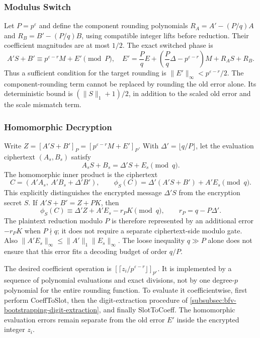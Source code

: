 \subsubsection{Modulus Switch}
\label{subsubsec:bfv-bootstrapping-modulus-switch}

Let $P=p^\varepsilon$ and define the component rounding polynomials $R_A=A'-(P/q)A$ and $R_B=B'-(P/q)B$, using compatible integer lifts before reduction. Their coefficient magnitudes are at most $1/2$. The exact switched phase is
\[
A'S+B'\equiv p^{\varepsilon-r}M+E'\pmod P,
\quad E'=\frac PqE+\left(\frac Pq\Delta-p^{\varepsilon-r}\right)M+R_AS+R_B.
\]
Thus a sufficient condition for the target rounding is $\|E'\|_\infty<p^{\varepsilon-r}/2$. The component-rounding term cannot be replaced by rounding the old error alone. Its deterministic bound is $(\|S\|_1+1)/2$, in addition to the scaled old error and the scale mismatch term.

\subsubsection{Homomorphic Decryption}
\label{subsubsec:bfv-bootstrapping-homomorphic-decryption}

Write $Z=[A'S+B']_P=[p^{\varepsilon-r}M+E']_P$. With $\Delta'=\lfloor q/P\rfloor$, let the evaluation ciphertext $(A_s,B_s)$ satisfy
\[
A_sS+B_s=\Delta'S+E_s\pmod q.
\]
The homomorphic inner product is the ciphertext
\[
C=(A'A_s,\ A'B_s+\Delta'B'),
\qquad \phi_S(C)=\Delta'(A'S+B')+A'E_s\pmod q.
\]
This explicitly distinguishes the encrypted message $\Delta'S$ from the encryption secret $S$. If $A'S+B'=Z+PK$, then
\[
\phi_S(C)\equiv\Delta'Z+A'E_s-r_PK\pmod q,
\qquad r_P=q-P\Delta'.
\]
The plaintext reduction modulo $P$ is therefore represented by an additional error $-r_PK$ when $P\nmid q$; it does not require a separate ciphertext-side modulo gate. Also $\|A'E_s\|_\infty\leq\|A'\|_1\|E_s\|_\infty$. The loose inequality $q\gg P$ alone does not ensure that this error fits a decoding budget of order $q/P$.

The desired coefficient operation is $[\lceil z_i/p^{\varepsilon-r}\rfloor]_{p^r}$. It is implemented by a sequence of polynomial evaluations and exact divisions, not by one degree-$p$ polynomial for the entire rounding function. To evaluate it coefficientwise, first perform \textsf{CoeffToSlot}, then the digit-extraction procedure of \autoref{subsubsec:bfv-bootstrapping-digit-extraction}, and finally \textsf{SlotToCoeff}. The homomorphic evaluation errors remain separate from the old error $E'$ inside the encrypted integer $z_i$.

